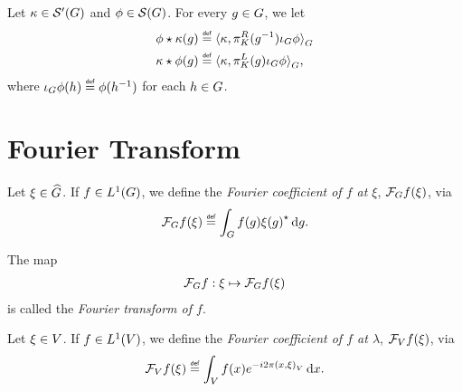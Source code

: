 \begin{definition}[Convolution]
    Let $\kappa \in \TemperedDistributions \Group$ and $\phi \in \Schwartz \Group$.
    For every $g \in \Group$,
    we let
    \begin{align*}
        \conv \phi \kappa(g) &\defeq \dualBracket [\Group] \kappa {\RightRegularRepresentation(g^{-1}) \InverseFunctionArgument \phi}\\
        \conv \kappa \phi(g) &\defeq \dualBracket [\Group] \kappa {\LeftRegularRepresentation(g) \InverseFunctionArgument \phi},
    \end{align*}
    where $\InverseFunctionArgument \phi(h) \defeq \phi(h^{-1})$ for each $h \in \Group$.
\end{definition}

\section{Fourier Transform}

\begin{definition}
\label{definition:Fourier_coefficient}
    Let $\xi \in \dualGroup\Group$.
    If $f \in \Lebesgue{1}{\Group}$,
    we define the \emph{Fourier coefficient of $f$ at $\xi$}, $\Fourier f(\xi)$, via
    \begin{align}
        \Fourier f(\xi) \defeq \int_\Group f(g) \adj{\xi(g)} \dd g.
        \label{eq:definition_of_Fourier_coefficient}
    \end{align}

    The map
    \begin{align*}
        \Fourier f : \xi \mapsto \Fourier f(\xi)
    \end{align*}
    is called the \emph{Fourier transform of $f$}.
\end{definition}

\begin{definition}
    Let $\xi \in \VectorSpace$.
    If $f \in \Lebesgue{1}\VectorSpace$,
    we define the \emph{Fourier coefficient of $f$ at $\lambda$}, $\Fourier[\VectorSpace] f(\xi)$, via
    \begin{align*}
        \Fourier[\VectorSpace] f(\xi) \defeq \int_\VectorSpace f(x) \e^{-\i \turn \ip{x}\xi} \dd x.
    \end{align*}
\end{definition}

